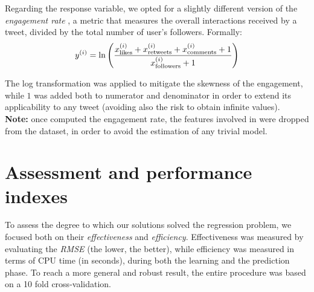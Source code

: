 \documentclass{article}
\begin{document}
Regarding the response variable, we opted for a slightly different version of the \textit{engagement rate} \cite{eng-rate1, eng-rate2}, a metric that measures the overall interactions received by a tweet, divided by the total number of user's followers. Formally:
\begin{equation}\label{eq:eng-rate}
  y^{(i)} = \ln \left( \frac{x_{\rm likes}^{(i)}+x_{\rm retweets}^{(i)}+x_{\rm comments}^{(i)}+1}{x_{\rm followers}^{(i)}+1} \right)  
\end{equation}

\noindent The log transformation was applied to mitigate the skewness of the engagement, while $1$ was added both to numerator and denominator in order to extend its applicability to any tweet (avoiding also the risk to obtain infinite values).\\[0.1cm]
\textbf{Note:} once computed the engagement rate, the features involved in  were dropped from the dataset, in order to avoid the estimation of any trivial model.

\section{Assessment and performance indexes}
\label{sec:assessment_performance_index}
To assess the degree to which our solutions solved the regression problem, we focused both on their \textit{effectiveness} and \textit{efficiency}. Effectiveness was measured by evaluating the \textit{RMSE} (the lower, the better), while efficiency was measured in terms of CPU time (in seconds), during both the learning and the prediction phase. To reach a more general and robust result, the entire procedure was based on a 10 fold cross-validation.
\end{document}
